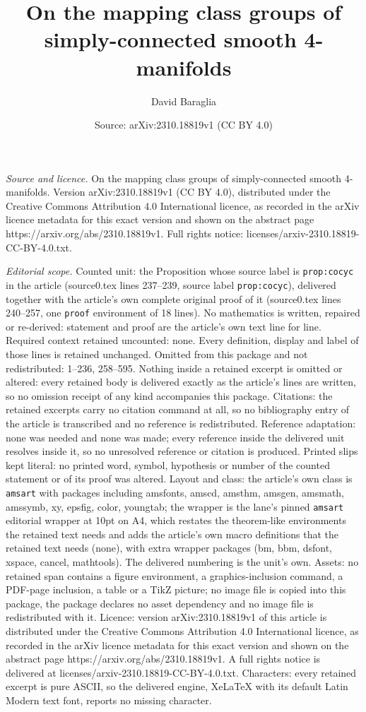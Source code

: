 \documentclass[10pt,a4paper]{amsart}
\title[On the mapping class groups of simply-connected smooth 4-man]{On the mapping class groups of simply-connected smooth 4-manifolds}
\author{David Baraglia}
\date{Source: arXiv:2310.18819v1 (CC BY 4.0)}
\begin{document}
\maketitle

\noindent\emph{Source and licence.} On the mapping class groups of simply-connected smooth 4-manifolds. Version arXiv:2310.18819v1 (CC BY 4.0), distributed under the Creative Commons Attribution 4.0 International licence, as recorded in the arXiv licence metadata for this exact version and shown on the abstract page https://arxiv.org/abs/2310.18819v1. Full rights notice: licenses/arxiv-2310.18819-CC-BY-4.0.txt.\par\smallskip

\noindent\textit{Editorial scope.} Counted unit: the Proposition whose source label is \texttt{prop:cocyc} in the article (source0.tex lines 237--239, source label \texttt{prop:cocyc}), delivered together with the article's own complete original proof of it (source0.tex lines 240--257, one \texttt{proof} environment of 18 lines). No mathematics is written, repaired or re-derived: statement and proof are the article's own text line for line. Required context retained uncounted: none. Every definition, display and label of those lines is retained unchanged. Omitted from this package and not redistributed: 1--236, 258--595. Nothing inside a retained excerpt is omitted or altered: every retained body is delivered exactly as the article's lines are written, so no omission receipt of any kind accompanies this package. Citations: the retained excerpts carry no citation command at all, so no bibliography entry of the article is transcribed and no reference is redistributed. Reference adaptation: none was needed and none was made; every reference inside the delivered unit resolves inside it, so no unresolved reference or citation is produced. Printed slips kept literal: no printed word, symbol, hypothesis or number of the counted statement or of its proof was altered. Layout and class: the article's own class is \texttt{amsart} with packages including amsfonts, amscd, amsthm, amsgen, amsmath, amssymb, xy, epsfig, color, youngtab; the wrapper is the lane's pinned \texttt{amsart} editorial wrapper at 10pt on A4, which restates the theorem-like environments the retained text needs and adds the article's own macro definitions that the retained text needs (none), with extra wrapper packages (bm, bbm, dsfont, xspace, cancel, mathtools). The delivered numbering is the unit's own. Assets: no retained span contains a figure environment, a graphics-inclusion command, a PDF-page inclusion, a table or a TikZ picture; no image file is copied into this package, the package declares no asset dependency and no image file is redistributed with it. Licence: version arXiv:2310.18819v1 of this article is distributed under the Creative Commons Attribution 4.0 International licence, as recorded in the arXiv licence metadata for this exact version and shown on the abstract page https://arxiv.org/abs/2310.18819v1. A full rights notice is delivered at licenses/arxiv-2310.18819-CC-BY-4.0.txt. Characters: every retained excerpt is pure ASCII, so the delivered engine, XeLaTeX with its default Latin Modern text font, reports no missing character.
\end{document}
